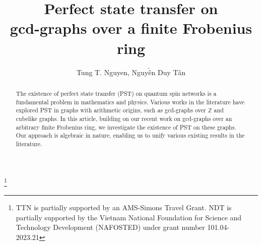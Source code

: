\documentclass[12pt, a4paper]{amsart}
\theoremstyle{definition}
\numberwithin{equation}{section}
\begin{document}
\title{Perfect state transfer on \\ gcd-graphs over a finite Frobenius ring}
 \author{Tung T. Nguyen, Nguy$\tilde{\text{\^{e}}}$n Duy T\^{a}n }



 \address{Department of Mathematics and Computer Science, Lake Forest College, Lake Forest, Illinois, USA}
 
  \address{
Faculty Mathematics and Informatics, Hanoi University of Science and Technology, 1 Dai Co Viet Road, Hanoi, Vietnam } 
 


\thanks{TTN is partially supported by an AMS-Simons Travel Grant.  NDT is partially supported by the Vietnam National
Foundation for Science and Technology Development (NAFOSTED) under grant number 101.04-2023.21}


\maketitle
\begin{abstract}
The existence of perfect state transfer (PST) on quantum spin networks is a fundamental problem in mathematics and physics. Various works in the literature have explored PST in graphs with arithmetic origins, such as gcd-graphs over $\mathbb{Z}$ and cubelike graphs. In this article, building on our recent work on gcd-graphs over an arbitrary finite Frobenius ring, we investigate the existence of PST on these graphs. Our approach is algebraic in nature, enabling us to unify various existing results in the literature.
\end{abstract}
\end{document}
